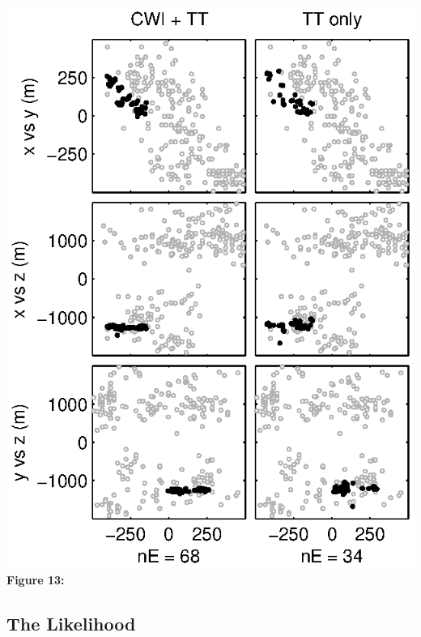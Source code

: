 \documentclass[12pt,double]{article}
\begin{document}

\clearpage
\includegraphics{Figure13_bw.eps} \\
\textbf{Figure 13:} 


\appendix
\clearpage

\vspace{2em}
\begin{centering}
\section*{The Likelihood}
\end{centering}

\label{sec-Appendix-noisylikelihood}
\end{document}
